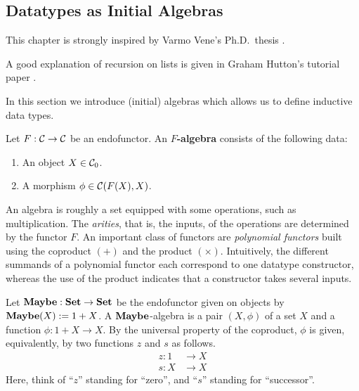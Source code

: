 \subsection{Datatypes as Initial Algebras}
\label{sec:datatypes-as-initial}



\begin{reading*}
  This chapter is strongly inspired by Varmo Vene's Ph.D.\ thesis \cite[Chapter 2]{vene_phd}.

  A good explanation of recursion on lists is given in Graham Hutton's tutorial paper \cite{DBLP:journals/jfp/Hutton99}.
\end{reading*}

In this section we introduce (initial) algebras which allows us to define inductive data types.

\begin{dfn} Let $F:\mathcal{C}\to \mathcal{C}$ be an endofunctor. An \textbf{$F$-algebra} consists of the following data:
\begin{enumerate}
\item An object $X\in {\mathcal{C}}_0$.
\item A morphism $\phi \in {\mathcal{C}}(F(X),X)$.
\end{enumerate}
\end{dfn}

\begin{intu}
An algebra is roughly a set equipped with some operations, such as multiplication.
The \emph{arities}, that is, the inputs, of the operations are determined by the functor $F$.
An important class of functors are \emph{polynomial functors} built using the coproduct $(+)$ and the product $(\times)$.
Intuitively, the different summands of a polynomial functor each correspond to one datatype constructor, whereas the use of the product indicates that a constructor takes several inputs.
\end{intu}

\begin{exa}\label{exa:nno_initial_alg_maybe}
 Let $\mathbf{Maybe} : \mathbf{Set} \to \mathbf{Set}$ be the endofunctor given on objects by $\mathbf{Maybe}(X) := 1 + X$. 
 A $\mathbf{Maybe}$-algebra is a pair $(X,\phi)$ of a set $X$ and a function $\phi : 1 + X \to X$.
 By the universal property of the coproduct, $\phi$ is given, equivalently,
 by two functions $z$ and $s$ as follows.
 \begin{align*}
    z : 1 &\to X
    \\
    s : X &\to X
 \end{align*}
Here, think of ``$z$'' standing for ``zero'', and ``$s$'' standing for ``successor''.
\end{exa}


